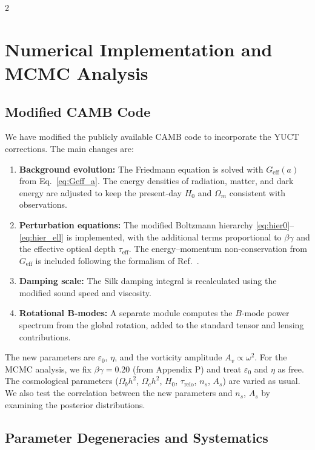 \documentclass[11pt,a4paper]{article}
\begin{document}
	\begin{multicols}{2}
		
		\section{Numerical Implementation and MCMC Analysis}
		
		\subsection{Modified CAMB Code}
		
		We have modified the publicly available CAMB code \cite{Lewis2000} to incorporate the YUCT corrections. The main changes are:
		\begin{enumerate}
			\item \textbf{Background evolution:} The Friedmann equation is solved with $G_{\mathrm{eff}}(a)$ from Eq.~\eqref{eq:Geff_a}. The energy densities of radiation, matter, and dark energy are adjusted to keep the present‑day $H_0$ and $\Omega_m$ consistent with observations.
			\item \textbf{Perturbation equations:} The modified Boltzmann hierarchy \eqref{eq:hier0}--\eqref{eq:hier_ell} is implemented, with the additional terms proportional to $\beta\gamma$ and the effective optical depth $\tau_{\mathrm{eff}}$. The energy--momentum non‑conservation from $\dot{G}_{\mathrm{eff}}$ is included following the formalism of Ref.~\cite{Uzan2011}.
			\item \textbf{Damping scale:} The Silk damping integral is recalculated using the modified sound speed and viscosity.
			\item \textbf{Rotational B‑modes:} A separate module computes the $B$‑mode power spectrum from the global rotation, added to the standard tensor and lensing contributions.
		\end{enumerate}
		The new parameters are $\varepsilon_0$, $\eta$, and the vorticity amplitude $A_v \propto \omega^2$. For the MCMC analysis, we fix $\beta\gamma = 0.20$ (from Appendix P) and treat $\varepsilon_0$ and $\eta$ as free. The cosmological parameters ($\Omega_b h^2$, $\Omega_c h^2$, $H_0$, $\tau_{\mathrm{reio}}$, $n_s$, $A_s$) are varied as usual. We also test the correlation between the new parameters and $n_s$, $A_s$ by examining the posterior distributions.
		
		\subsection{Parameter Degeneracies and Systematics}
		

\end{multicols}
\end{document}
